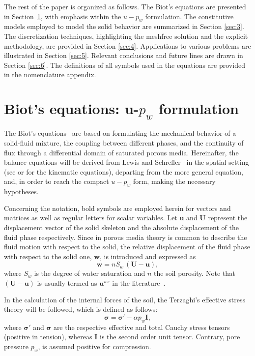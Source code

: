 \documentclass[twocolumn]{svjour3}          %
\begin{document}
The rest of the paper is organized as follows. The Biot's equations are presented in Section~\ref{sec:2}, with emphasis within the $u-p_w$ formulation. The constitutive models employed to model the solid behavior are summarized in Section \ref{sec:3}. The discretization techniques, highlighting the meshfree solution and the explicit methodology, are provided in Section \ref{sec:4}. Applications to various problems are illustrated in Section \ref{sec:5}. Relevant conclusions and future lines are drawn in Section \ref{sec:6}. The definitions of all symbols used in the equations are provided in the nomenclature appendix.    


\section{Biot's equations: u-$p_w$ formulation}
\label{sec:2}

The Biot's equations~\cite{Biot1956} are based on formulating the mechanical behavior of a solid-fluid mixture, the coupling between different phases, and the continuity of flux through a differential domain of saturated porous media. Hereinafter, the balance equations will be derived from Lewis and Schrefler~\cite{LewisSchrefler98} in the spatial setting (see \cite{LewisSchrefler98} or \cite{Sanavia:02b,Sanavia:02} for the kinematic equations), departing from the more general equation, and, in order to reach the compact $u-p_w$ form, making the necessary hypotheses.

Concerning the notation, bold symbols are employed herein for vectors and matrices as well as regular letters for scalar variables.  Let   $\boldsymbol{u}$ and   $\boldsymbol{U}$ represent  the displacement vector of the solid skeleton   and the absolute displacement of the fluid phase respectively. Since in porous media theory is common to describe the fluid motion with respect to the solid, the
relative displacement of the fluid phase with respect to the solid one, $\boldsymbol{w}$, is introduced and expressed as~\cite{LopezQuerol2008}
\begin{equation}\label{eq_uw1}
\boldsymbol{ w }=n S_w\, \boldsymbol{  \left(U-u\right) },
\end{equation}
where $S_w$ is the degree of water saturation and $n$ the soil porosity.  Note that $\boldsymbol{  \left(U-u\right) }$ is usually  termed as $\boldsymbol{u}^{ws}$ in the literature~\cite{LewisSchrefler98}. 

In the calculation of the internal forces of the soil, the Terzaghi's effective stress theory  \cite{Terzaghi1925} will be followed, which is defined as follows:
\begin{equation}\label{eq_uw5}
 \boldsymbol{ \sigma} =\boldsymbol{ \sigma'} - \alpha p_{w}\textbf{I},
\end{equation}
where $ \boldsymbol{ \sigma'} $ and  $\boldsymbol{ \sigma}$ are the respective effective and total Cauchy stress tensors (positive in tension), whereas $\textbf{I}$ is the second order unit tensor.  Contrary, pore pressure $p_w$, is assumed positive for compression.
\end{document}

